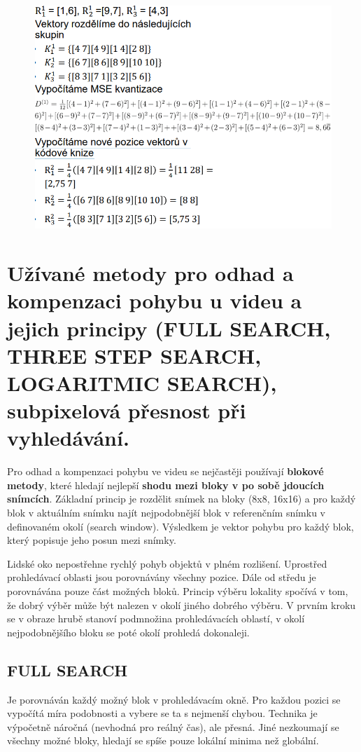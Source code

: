 \begin{figure}[ht]
    \centering
    \includegraphics[width=0.5\linewidth]{MPC-ZMD//images/LBG.png}
\end{figure}
\FloatBarrier


\section{Užívané metody pro odhad a kompenzaci pohybu u videu a jejich principy (FULL SEARCH, THREE STEP SEARCH, LOGARITMIC SEARCH), subpixelová přesnost při vyhledávání.}

Pro odhad a kompenzaci pohybu ve videu se nejčastěji používají \textbf{blokové metody}, které hledají nejlepší \textbf{shodu mezi bloky v po sobě jdoucích snímcích}. Základní princip je rozdělit snímek na bloky (8x8, 16x16) a pro každý blok v aktuálním snímku najít nejpodobnější blok v referenčním snímku v definovaném okolí (search window). Výsledkem je vektor pohybu pro každý blok, který popisuje jeho posun mezi snímky. 

Lidské oko nepostřehne rychlý pohyb objektů v plném rozlišení. Uprostřed prohledávací oblasti jsou porovnávány všechny pozice. Dále od středu je porovnávána pouze část možných bloků. Princip výběru lokality spočívá v tom, že dobrý výběr může být nalezen v okolí jiného dobrého výběru. V prvním kroku se v obraze hrubě stanoví podmnožina prohledávacích oblastí, v okolí nejpodobnějšího bloku se poté okolí prohledá dokonaleji.


\subsection{FULL SEARCH}

Je porovnáván každý možný blok v prohledávacím okně. Pro každou pozici se vypočítá míra podobnosti a vybere se ta s nejmenší chybou. Technika je výpočetně náročná (nevhodná pro reálný čas), ale přesná. Jiné nezkoumají se všechny možné bloky, hledají se spíše pouze lokální minima než globální.

